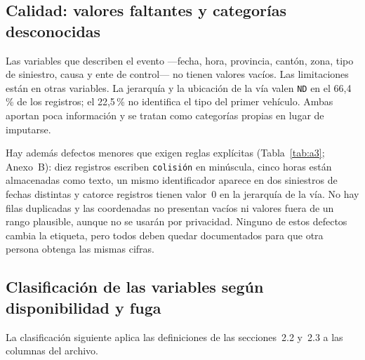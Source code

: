 \subsection{Calidad: valores faltantes y categorías desconocidas}

Las variables que describen el evento ---fecha, hora, provincia, cantón, zona, tipo de siniestro, causa y ente de control--- no tienen valores vacíos. Las limitaciones están en otras variables. La jerarquía y la ubicación de la vía valen \texttt{ND} en el 66,4\,\% de los registros; el 22,5\,\% no identifica el tipo del primer vehículo. Ambas aportan poca información y se tratan como categorías propias en lugar de imputarse.

Hay además defectos menores que exigen reglas explícitas (Tabla~\ref{tab:a3}; Anexo~B): diez registros escriben \texttt{colisión} en minúscula, cinco horas están almacenadas como texto, un mismo identificador aparece en dos siniestros de fechas distintas y catorce registros tienen valor~0 en la jerarquía de la vía. No hay filas duplicadas y las coordenadas no presentan vacíos ni valores fuera de un rango plausible, aunque no se usarán por privacidad. Ninguno de estos defectos cambia la etiqueta, pero todos deben quedar documentados para que otra persona obtenga las mismas cifras.

\subsection{Clasificación de las variables según disponibilidad y fuga}

La clasificación siguiente aplica las definiciones de las secciones~2.2 y~2.3 a las columnas del archivo.

